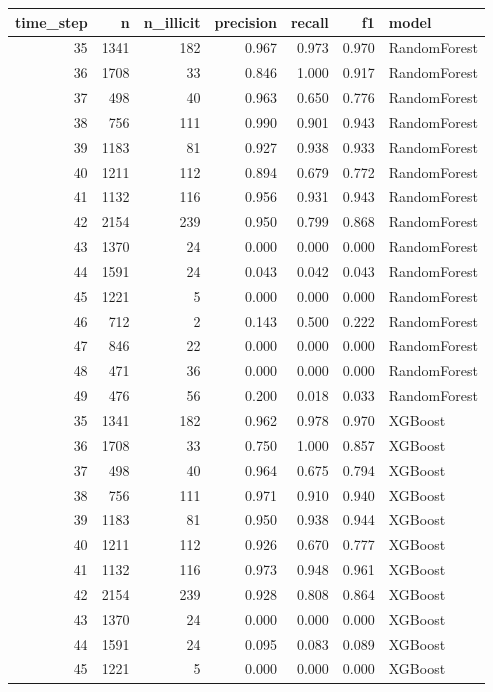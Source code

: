 \begin{tabular}{rrrrrrl}
\toprule
time_step & n & n_illicit & precision & recall & f1 & model \\
\midrule
35 & 1341 & 182 & 0.967 & 0.973 & 0.970 & RandomForest \\
36 & 1708 & 33 & 0.846 & 1.000 & 0.917 & RandomForest \\
37 & 498 & 40 & 0.963 & 0.650 & 0.776 & RandomForest \\
38 & 756 & 111 & 0.990 & 0.901 & 0.943 & RandomForest \\
39 & 1183 & 81 & 0.927 & 0.938 & 0.933 & RandomForest \\
40 & 1211 & 112 & 0.894 & 0.679 & 0.772 & RandomForest \\
41 & 1132 & 116 & 0.956 & 0.931 & 0.943 & RandomForest \\
42 & 2154 & 239 & 0.950 & 0.799 & 0.868 & RandomForest \\
43 & 1370 & 24 & 0.000 & 0.000 & 0.000 & RandomForest \\
44 & 1591 & 24 & 0.043 & 0.042 & 0.043 & RandomForest \\
45 & 1221 & 5 & 0.000 & 0.000 & 0.000 & RandomForest \\
46 & 712 & 2 & 0.143 & 0.500 & 0.222 & RandomForest \\
47 & 846 & 22 & 0.000 & 0.000 & 0.000 & RandomForest \\
48 & 471 & 36 & 0.000 & 0.000 & 0.000 & RandomForest \\
49 & 476 & 56 & 0.200 & 0.018 & 0.033 & RandomForest \\
35 & 1341 & 182 & 0.962 & 0.978 & 0.970 & XGBoost \\
36 & 1708 & 33 & 0.750 & 1.000 & 0.857 & XGBoost \\
37 & 498 & 40 & 0.964 & 0.675 & 0.794 & XGBoost \\
38 & 756 & 111 & 0.971 & 0.910 & 0.940 & XGBoost \\
39 & 1183 & 81 & 0.950 & 0.938 & 0.944 & XGBoost \\
40 & 1211 & 112 & 0.926 & 0.670 & 0.777 & XGBoost \\
41 & 1132 & 116 & 0.973 & 0.948 & 0.961 & XGBoost \\
42 & 2154 & 239 & 0.928 & 0.808 & 0.864 & XGBoost \\
43 & 1370 & 24 & 0.000 & 0.000 & 0.000 & XGBoost \\
44 & 1591 & 24 & 0.095 & 0.083 & 0.089 & XGBoost \\
45 & 1221 & 5 & 0.000 & 0.000 & 0.000 & XGBoost \\

\end{tabular}
